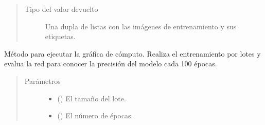 \begin{fulllineitems}
\begin{fulllineitems}
\begin{quote}
\begin{description}
\item[{Tipo del valor devuelto}] \leavevmode
Una dupla de listas con las imágenes de entrenamiento y sus etiquetas.

\end{description}\end{quote}

\end{fulllineitems}


\begin{fulllineitems}
\label{\detokenize{model_desc:cnn_indoor_classifier_model.CNNClassifierLAR.run_graph}}
Método para ejecutar la gráfica de cómputo. Realiza el entrenamiento
por lotes y evalua la red para conocer la precisión del modelo
cada 100 épocas.
\begin{quote}\begin{description}
\item[{Parámetros}] \leavevmode\begin{itemize}
\item {} 
 () \textendash{} El tamaño del lote.

\item {} 
 () \textendash{} El número de épocas.

\end{itemize}

\end{description}\end{quote}

\end{fulllineitems}


\end{fulllineitems}


